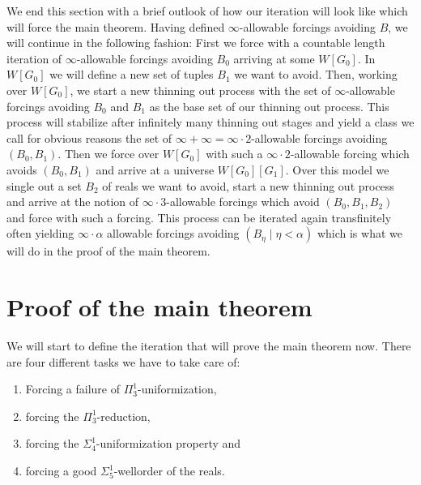 \documentclass[a4paper,11pt]{article}
\begin{document}
We end this section with a brief outlook of how our iteration will look like which will force the main theorem.   
Having defined $\infty$-allowable forcings avoiding $B$, we will continue in the following fashion: First we force with a countable length iteration of $\infty$-allowable forcings avoiding $B_0$ arriving at some $W[G_0]$. In $W[G_0]$ we will define a new set of tuples $B_1$ we want to avoid. 
Then, working over $W[G_0]$, we start a new thinning out process with the set of $\infty$-allowable forcings avoiding $B_0 $ and $B_1$ as the base set of our thinning out process. This process will stabilize after infinitely many thinning out stages and yield a class we call for obvious reasons the set of $\infty + \infty= \infty \cdot 2$-allowable forcings avoiding $(B_0,B_1)$. Then we force over $W[G_0]$ with such a $\infty \cdot 2$-allowable forcing which avoids $(B_0,B_1)$ and arrive at a universe $W[G_0][G_1]$. Over this model we single out a set $B_2$ of reals we want to avoid, start a new thinning out process and arrive at the notion of $\infty \cdot 3$-allowable forcings which avoid $(B_0,B_1,B_2)$ and force with such a forcing. This process can be iterated again transfinitely often yielding $\infty \cdot \alpha$ allowable forcings avoiding $(B_{\eta} \mid \eta < \alpha)$  which is what we will do in the proof of the main theorem.
    ﻿
\section{Proof of the main theorem}

We will start to define the iteration that will prove the main theorem now. There are four different tasks we have to take care of:
\begin{enumerate}
\item Forcing a failure of $\Pi^1_3$-uniformization,
\item forcing the $\Pi^1_3$-reduction,

\item forcing the $\Sigma^1_4$-uniformization property and
\item forcing  a good $\Sigma^1_5$-wellorder of the reals.
\end{enumerate}
\end{document}
